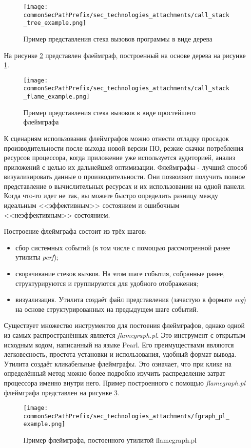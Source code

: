 \begin{figure}[ht]
    \centering
    \texttt{[image: \\commonSecPathPrefix/sec\_technologies\_attachments/call\_stack\_tree\_example.png]}
    \caption{Пример представления стека вызовов программы в виде дерева}
    \label{sec_tech:fig:flamegraph_tree}
\end{figure}

На рисунке \ref{sec_tech:fig:flamegraph_example_from_tree} представлен флеймграф, построенный на основе дерева на рисунке \ref{sec_tech:fig:flamegraph_tree}.

\begin{figure}[ht]
    \centering
    \texttt{[image: \\commonSecPathPrefix/sec\_technologies\_attachments/call\_stack\_flame\_example.png]}
    \caption{Пример представления стека вызовов в виде простейшего флеймграфа}
    \label{sec_tech:fig:flamegraph_example_from_tree}
\end{figure}

К сценариям использования флеймграфов можно отнести отладку просадок производительности после выхода новой версии ПО,
резкие скачки потребления ресурсов процессора, когда приложение уже используется аудиторией, анализ приложений с целью
их дальнейшей оптимизации.
Флеймграфы - лучший способ визуализировать данные о производительности.
Они позволяют получить полное представление о вычислительных ресурсах и их использовании на одной панели. 
Когда что-то идет не так, вы можете быстро определить разницу между идеальным <<эффективным>> состоянием и ошибочным <<неэффективным>> состоянием.

Построение флеймграфа состоит из трёх шагов:
\begin{itemize}
    \item сбор системных событий (в том числе с помощью рассмотренной ранее утилиты \textit{perf});
    \item сворачивание стеков вызвов. На этом шаге события, собранные ранее, структурируются и группируются для удобного отображения;
    \item визуализация. Утилита создаёт файл представления (зачастую в формате \textit{svg}) на основе структурированных на предыдущем шаге событий.
\end{itemize}

Существует множество инструментов для постоения флеймграфов, однако одной из самых распространённых является \textit{flamegraph.pl}.
Это инструмент с открытым исходным кодом, написанный на языке Pearl. Его преимуществами являются легковесность, простота установки и использования,
удобный формат вывода. Утилита создаёт кликабельные флеймграфы. Это означает, что при клике на определённый метод можно более подробно изучить распределение
затрат процессора именно внутри него. Пример построенного с помощью \textit{flamegraph.pl} флеймграфа представлен на рисунке \ref{sec_tech:fig:flamegraph_pl_example}.

\begin{figure}[ht]
    \centering
    \texttt{[image: \\commonSecPathPrefix/sec\_technologies\_attachments/fgraph\_pl\_example.png]}
    \caption{Пример флеймграфа, постоенного утилитой flamegraph.pl}
    \label{sec_tech:fig:flamegraph_pl_example}
\end{figure}
